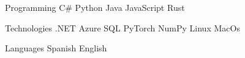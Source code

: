 


\begin{cvskills}

  \cvskill
    {Programming} %
    {{\enskip\cdotp\enskip} C\#
     {\enskip\cdotp\enskip} Python
     {\enskip\cdotp\enskip} Java
     {\enskip\cdotp\enskip} JavaScript
     {\enskip\cdotp\enskip} Rust} %

  \cvskill
    {Technologies} %
    {
      {\enskip\cdotp\enskip}.NET 
      {\enskip\cdotp\enskip} Azure 
      {\enskip\cdotp\enskip} SQL 
      {\enskip\cdotp\enskip} PyTorch 
      {\enskip\cdotp\enskip} NumPy
      {\enskip\cdotp\enskip} Linux
      {\enskip\cdotp\enskip} MacOs
    } 

  \cvskill
    {Languages} %
    {{\enskip\cdotp\enskip}Spanish {\enskip\cdotp\enskip}English} %
\end{cvskills}